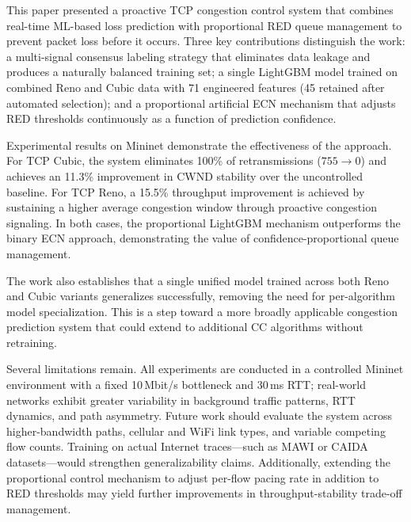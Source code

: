 This paper presented a proactive TCP congestion control system that combines real-time ML-based loss prediction with proportional RED queue management to prevent packet loss before it occurs. Three key contributions distinguish the work: a multi-signal consensus labeling strategy that eliminates data leakage and produces a naturally balanced training set; a single LightGBM model trained on combined Reno and Cubic data with 71 engineered features (45 retained after automated selection); and a proportional artificial ECN mechanism that adjusts RED thresholds continuously as a function of prediction confidence.

Experimental results on Mininet demonstrate the effectiveness of the approach. For TCP Cubic, the system eliminates 100\% of retransmissions ($755 \rightarrow 0$) and achieves an 11.3\% improvement in CWND stability over the uncontrolled baseline. For TCP Reno, a 15.5\% throughput improvement is achieved by sustaining a higher average congestion window through proactive congestion signaling. In both cases, the proportional LightGBM mechanism outperforms the binary ECN approach, demonstrating the value of confidence-proportional queue management.

The work also establishes that a single unified model trained across both Reno and Cubic variants generalizes successfully, removing the need for per-algorithm model specialization. This is a step toward a more broadly applicable congestion prediction system that could extend to additional CC algorithms without retraining.

Several limitations remain. All experiments are conducted in a controlled Mininet environment with a fixed 10\,Mbit/s bottleneck and 30\,ms RTT; real-world networks exhibit greater variability in background traffic patterns, RTT dynamics, and path asymmetry. Future work should evaluate the system across higher-bandwidth paths, cellular and WiFi link types, and variable competing flow counts. Training on actual Internet traces---such as MAWI or CAIDA datasets---would strengthen generalizability claims. Additionally, extending the proportional control mechanism to adjust per-flow pacing rate in addition to RED thresholds may yield further improvements in throughput-stability trade-off management.

